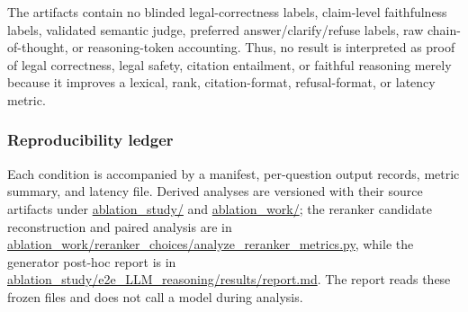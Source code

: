 The artifacts contain no blinded legal-correctness labels, claim-level
faithfulness labels, validated semantic judge, preferred
answer/clarify/refuse labels, raw chain-of-thought, or reasoning-token
accounting. Thus, no result is interpreted as proof of legal correctness,
legal safety, citation entailment, or faithful reasoning merely because it
improves a lexical, rank, citation-format, refusal-format, or latency metric.

\subsubsection{Reproducibility ledger}

Each condition is accompanied by a manifest, per-question output records,
metric summary, and latency file. Derived analyses are versioned with their
source artifacts under \url{ablation_study/} and \url{ablation_work/}; the
reranker candidate reconstruction and paired analysis are in
\url{ablation_work/reranker_choices/analyze_reranker_metrics.py}, while the
generator post-hoc report is in
\url{ablation_study/e2e_LLM_reasoning/results/report.md}. The report reads
these frozen files and does not call a model during analysis.
